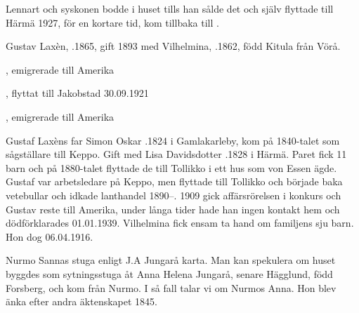 Lennart och syskonen bodde i huset tills han sålde det och själv flyttade till Härmä 1927, för en kortare tid, kom tillbaka till .\jhvspace{}


Gustav Laxèn, .1865, gift 1893 med Vilhelmina, .1862, född Kitula från Vörå.
\begin{jhchildren}
  \item {}
  \item {}, emigrerade till Amerika
  \item {}
  \item {}
  \item {}, flyttat till Jakobstad 30.09.1921
  \item {}
  \item {}, emigrerade till Amerika
\end{jhchildren}
Gustaf Laxèns far Simon Oskar .1824 i Gamlakarleby, kom på 1840-talet som sågställare till Keppo. Gift med Lisa Davidsdotter .1828 i Härmä. Paret fick 11 barn och på 1880-talet flyttade de 	till Tollikko i ett hus som von Essen ägde. Gustaf var arbetsledare på Keppo, men flyttade till Tollikko och började baka vetebullar och idkade lanthandel 1890--. 1909 gick affärsrörelsen i konkurs och Gustav reste till Amerika, under långa tider hade han ingen 	kontakt hem och dödförklarades 01.01.1939. Vilhelmina fick ensam ta hand om familjens sju barn. Hon dog 06.04.1916.




Nurmo Sannas stuga enligt J.A Jungarå karta. Man kan spekulera om huset byggdes som sytningsstuga åt Anna Helena Jungarå, senare Hägglund, född Forsberg, och kom från Nurmo. I så fall talar vi om Nurmos Anna. Hon blev änka efter andra äktenskapet 1845.



